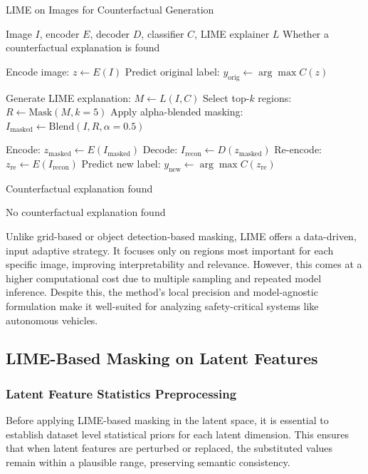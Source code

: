 \vspace{1em}
\begin{algorithm}[H]
\caption{LIME on Images for Counterfactual Generation}
\label{alg:lime_on_images}
\begin{algorithmic}[1]
\REQUIRE Image $I$, encoder $E$, decoder $D$, classifier $C$, LIME explainer $L$
\ENSURE Whether a counterfactual explanation is found

\STATE Encode image: $z \leftarrow E(I)$
\STATE Predict original label: $y_{\text{orig}} \leftarrow \arg\max C(z)$

\STATE Generate LIME explanation: $M \leftarrow L(I, C)$
\STATE Select top-$k$ regions: $R \leftarrow \text{Mask}(M, k=5)$
\STATE Apply alpha-blended masking: $I_{\text{masked}} \leftarrow \text{Blend}(I, R, \alpha=0.5)$

\STATE Encode: $z_{\text{masked}} \leftarrow E(I_{\text{masked}})$
\STATE Decode: $I_{\text{recon}} \leftarrow D(z_{\text{masked}})$
\STATE Re-encode: $z_{\text{re}} \leftarrow E(I_{\text{recon}})$
\STATE Predict new label: $y_{\text{new}} \leftarrow \arg\max C(z_{\text{re}})$

    \RETURN Counterfactual explanation found
\ENDIF

\RETURN No counterfactual explanation found
\end{algorithmic}
\end{algorithm}
\vspace{1em}

Unlike grid-based or object detection-based masking, LIME offers a data-driven, input adaptive strategy. It focuses only on regions most important for each specific image, improving interpretability and relevance. However, this comes at a higher computational cost due to multiple sampling and repeated model inference. Despite this, the method’s local precision and model-agnostic formulation make it well-suited for analyzing safety-critical systems like autonomous vehicles.





\subsection{LIME-Based Masking on Latent Features} \label{sec:lime_based_masking_on_latent_features}

\subsubsection*{Latent Feature Statistics Preprocessing}
\label{sec:latent_statistics_preprocessing}
Before applying LIME-based masking in the latent space, it is essential to establish dataset level statistical priors for each latent dimension. This ensures that when latent features are perturbed or replaced, the substituted values remain within a plausible range, preserving semantic consistency.

